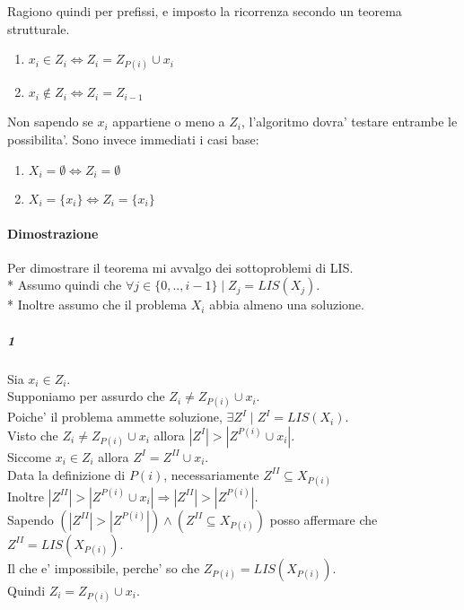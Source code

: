 Ragiono quindi per prefissi, e imposto la ricorrenza secondo un teorema strutturale. \\

\begin{enumerate}
    \item $x_i \in Z_i \Leftrightarrow Z_i = Z_{P(i)} \cup x_i$
    \item $x_i \notin Z_i \Leftrightarrow Z_i = Z_{i-1}$
\end{enumerate}

Non sapendo se $x_i$ appartiene o meno a $Z_i$, l'algoritmo dovra' testare entrambe le possibilita'.
Sono invece immediati i casi base:

\begin{enumerate}
    \item $X_i = \emptyset \Leftrightarrow Z_i = \emptyset$
    \item $X_i = \{x_i\} \Leftrightarrow Z_i = \{x_i\}$
\end{enumerate}

\paragraph{Dimostrazione}

Per dimostrare il teorema mi avvalgo dei sottoproblemi di LIS. \\*
Assumo quindi che $\forall j \in \{0,..,i-1\} \mid Z_j = LIS(X_j)$. \\*
Inoltre assumo che il problema $X_i$ abbia almeno una soluzione.

\subparagraph{1}

Sia $x_i \in Z_i$. \\
Supponiamo per assurdo che $Z_i \ne Z_{P(i)} \cup x_i$. \\
Poiche' il problema ammette soluzione, $\exists Z^I \mid Z^I = LIS(X_i)$. \\
Visto che $Z_i \ne Z_{P(i)} \cup x_i$ allora $|Z^I| > |Z^{P(i)} \cup x_i|$.\\
Siccome $x_i \in Z_i$ allora $Z^I = Z^{II} \cup x_i$. \\
Data la definizione di $P(i)$, necessariamente $Z^{II} \subseteq X_{P(i)}$ \\
Inoltre $|Z^{II}| > |Z^{P(i)} \cup x_i| \Rightarrow |Z^{II}| > |Z^{P(i)}|$. \\
Sapendo $(|Z^{II}| > |Z^{P(i)}|) \land (Z^{II} \subseteq X_{P(i)})$ posso affermare che $Z^{II} = LIS(X_{P(i)})$. \\
Il che e' impossibile, perche' so che $Z_{P(i)} = LIS(X_{P(i)})$. \\
Quindi $Z_i = Z_{P(i)} \cup x_i$.

